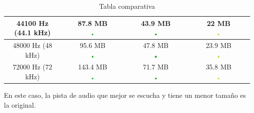 \documentclass[11pt,a4paper]{article}
\begin{document}
\begin{table}[H]
\begin{tabular}{|c|c|c|c|}
44100 Hz (44.1 kHz) & \makecell{87.8 MB\\ \includegraphics[width=0.03\textwidth]{mb.png}} & \makecell{43.9 MB\\ \includegraphics[width=0.03\textwidth]{mb.png}} & \makecell{22 MB\\ \includegraphics[width=0.03\textwidth]{r.png}} \\ \hline

48000 Hz (48 kHz) & \makecell{95.6 MB\\ \includegraphics[width=0.03\textwidth]{mb.png}} & \makecell{47.8 MB\\ \includegraphics[width=0.03\textwidth]{mb.png}} & \makecell{23.9 MB\\ \includegraphics[width=0.03\textwidth]{r.png}} \\ \hline

72000 Hz (72 kHz) & \makecell{143.4 MB\\ \includegraphics[width=0.03\textwidth]{mb.png}} & \makecell{71.7 MB\\ \includegraphics[width=0.03\textwidth]{mb.png}} & \makecell{35.8 MB\\\includegraphics[width=0.03\textwidth]{r.png}} \\ \hline
\end{tabular}
\caption{Tabla comparativa}
\label{my-label}
\end{table}

En este caso, la pista de audio que mejor se escucha y tiene un menor tamaño es la original.
\end{document}
